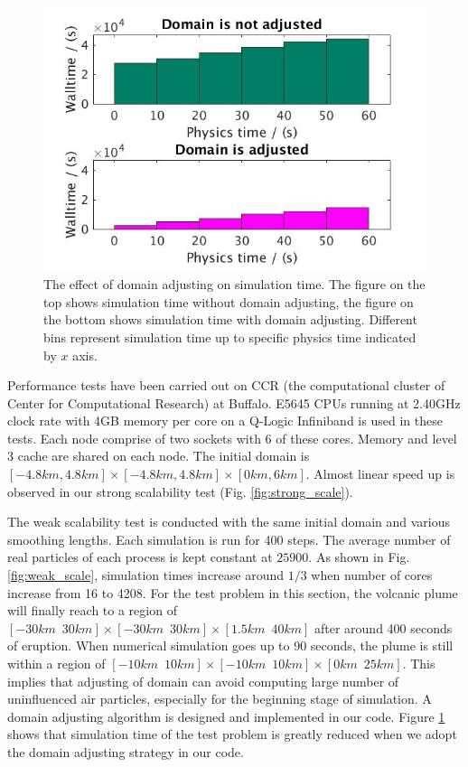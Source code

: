 \documentclass[journal abbreviation, manuscript]{copernicus}
\begin{document}
\begin{figure}[!t]
\centering
\includegraphics[scale=0.35]{adj_vs_no}
\caption{The effect of domain adjusting on simulation time. The figure on the top shows simulation time without domain adjusting, the figure on the bottom shows simulation time with domain adjusting. Different bins represent simulation time up to specific physics time indicated by $x$ axis.}
\label{fig:adj_vs_no}
\end{figure}

Performance tests have been carried out on CCR (the computational cluster of Center for Computational Research) at Buffalo. E5645 CPUs running at 2.40GHz clock rate with 4GB memory per core on a Q-Logic Infiniband is used in these tests. Each node comprise of two sockets with 6 of these cores. Memory and level 3 cache are shared on each node. The initial domain is $[-4.8km,4.8km] \times [-4.8km,4.8km] \times [0km, 6km]$. Almost linear speed up is observed in our strong scalability test (Fig. \ref{fig:strong_scale}).

The weak scalability test is conducted with the same initial domain and various smoothing lengths. Each simulation is run for 400 steps. The average number of real particles of each process is kept constant at $25900$. As shown in Fig. \ref{fig:weak_scale}, simulation times increase around $1/3$ when number of cores increase from 16 to 4208. For the test problem in this section, the volcanic plume will finally reach to a region of $[-30km \,\,\, 30km] \times [-30km\,\,\,30km] \times [1.5km\,\,\,40km]$ after around 400 seconds of eruption. When numerical simulation goes up to 90 seconds, the plume is still within a region of $[-10km\,\,\,10km] \times [-10km\,\,\,10km] \times [0km\,\,\,25km]$. This implies that adjusting of domain can avoid computing large number of uninfluenced air particles, especially for the beginning stage of simulation. A domain adjusting algorithm is designed and implemented in our code. Figure \ref{fig:adj_vs_no} shows that simulation time of the test problem is greatly reduced when we adopt the domain adjusting strategy in our code.
\end{document}
